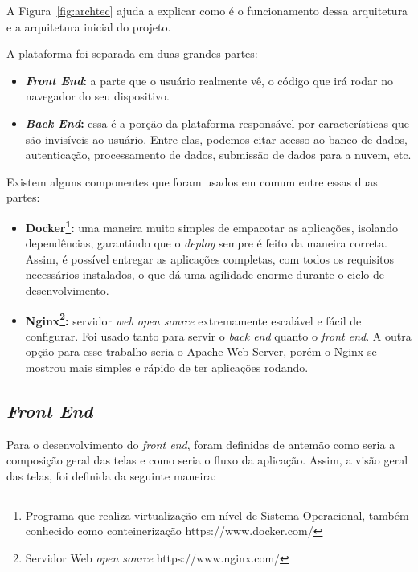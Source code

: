 \documentclass[11pt,twoside]{article}
\begin{document}
A Figura~\ref{fig:archtec} ajuda a explicar como é o funcionamento dessa arquitetura e a arquitetura inicial do projeto.

A plataforma foi separada em duas grandes partes:

\begin{itemize}
  \item \textbf{\emph{Front End}:} a parte que o usuário realmente vê, o código que irá rodar no navegador do seu dispositivo. 
  \item \textbf{\emph{Back End}:} essa é a porção da plataforma responsável por características que são invisíveis ao usuário. Entre elas, podemos citar acesso ao banco de dados, autenticação, processamento de dados,
  submissão de dados para a nuvem, etc.
\end{itemize}

Existem alguns componentes que foram usados em comum entre essas duas partes:

\begin{itemize}
  \item \textbf{Docker\footnote{Programa que realiza virtualização em nível de Sistema Operacional, também conhecido como conteinerização https://www.docker.com/}:} 
  uma maneira muito simples de empacotar as aplicações, isolando dependências, garantindo que o \emph{deploy} sempre é feito da maneira correta. Assim, é possível entregar as aplicações completas, com
  todos os requisitos necessários instalados, o que dá uma agilidade enorme durante o ciclo de desenvolvimento.
  \item \textbf{Nginx\footnote{Servidor Web \emph{open source} https://www.nginx.com/}:} servidor \emph{web open source} extremamente escalável e fácil de configurar. Foi usado tanto para servir o \emph{back end} quanto o \emph{front end}. 
  A outra opção para esse trabalho seria o Apache Web Server, porém o Nginx se mostrou mais simples e rápido de ter aplicações rodando.
\end{itemize}

\subsection{\emph{Front End}}

Para o desenvolvimento do \emph{front end}, foram definidas de antemão como seria a composição geral das telas e como seria o fluxo da aplicação. Assim, a visão geral das telas, foi definida da seguinte maneira:
\end{document}
